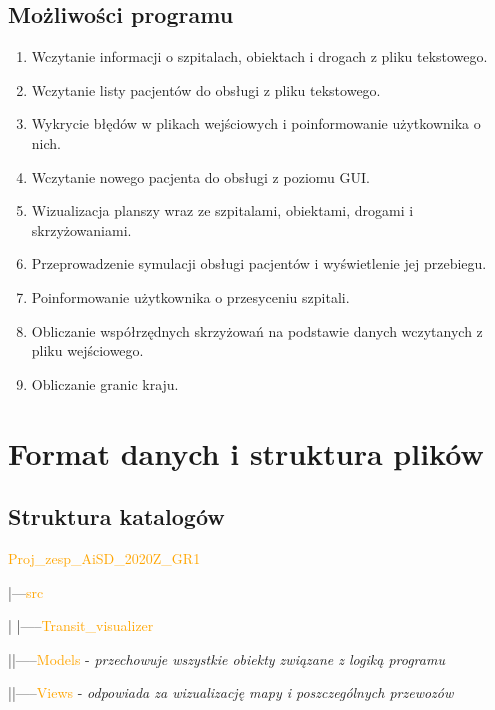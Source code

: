 \documentclass[]{article}
\begin{document}
    \subsection{Możliwości programu}
    \begin{enumerate}
        \item Wczytanie informacji o szpitalach, obiektach i drogach z pliku tekstowego.
        \item Wczytanie listy pacjentów do obsługi z pliku tekstowego.
        \item Wykrycie błędów w plikach wejściowych i poinformowanie użytkownika o nich.
        \item Wczytanie nowego pacjenta do obsługi z poziomu GUI.
        \item Wizualizacja planszy wraz ze szpitalami, obiektami, drogami i skrzyżowaniami.
        \item Przeprowadzenie symulacji obsługi pacjentów i wyświetlenie jej przebiegu.
        \item Poinformowanie użytkownika o przesyceniu szpitali.
        \item Obliczanie współrzędnych skrzyżowań na podstawie danych wczytanych z pliku wejściowego.
        \item Obliczanie granic kraju.
    \end{enumerate}
    


    \section{Format danych i struktura plików}

    \subsection{Struktura katalogów} %
    \textcolor{orange}{Proj\_zesp\_AiSD\_2020Z\_GR1}

    |---\textcolor{orange}{src}

    |\hspace{4mm} |-----\textcolor{orange}{Transit\_visualizer}

    |\hspace{15mm}|-----\textcolor{orange}{Models} - \textit{przechowuje wszystkie obiekty związane z logiką programu}

    |\hspace{15mm}|-----\textcolor{orange}{Views} -\textit{ odpowiada za wizualizację mapy i poszczególnych przewozów}
\end{document}

